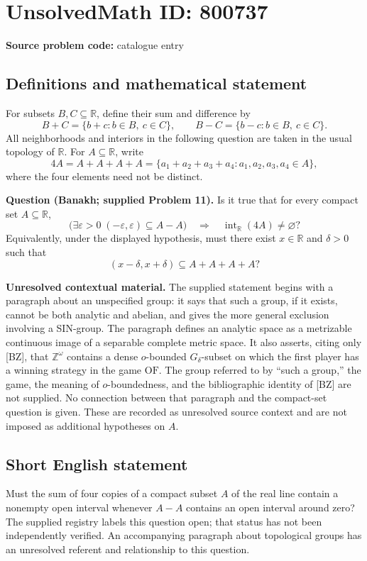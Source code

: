 \documentclass[11pt]{article}
\newcommand{\R}{\mathbb{R}}
\begin{document}
\section*{UnsolvedMath ID: 800737}
\textbf{Source problem code:} catalogue entry
\subsection{Definitions and mathematical statement}
For subsets \(B,C\subseteq\R\), define their sum and difference by
\[
B+C=\{b+c:b\in B,\ c\in C\},\qquad B-C=\{b-c:b\in B,\ c\in C\}.
\]
All neighborhoods and interiors in the following question are taken in the usual topology of \(\R\). For \(A\subseteq\R\), write
\[
4A=A+A+A+A=\{a_1+a_2+a_3+a_4:a_1,a_2,a_3,a_4\in A\},
\]
where the four elements need not be distinct.

\textbf{Question (Banakh; supplied Problem 11).} Is it true that for every compact set \(A\subseteq\R\),
\[
\bigl(\exists\varepsilon>0\;(-\varepsilon,\varepsilon)\subseteq A-A\bigr)
\quad\Longrightarrow\quad
\operatorname{int}_{\R}(4A)\ne\varnothing?
\]
Equivalently, under the displayed hypothesis, must there exist \(x\in\R\) and \(\delta>0\) such that
\[
(x-\delta,x+\delta)\subseteq A+A+A+A?
\]

\textbf{Unresolved contextual material.} The supplied statement begins with a paragraph about an unspecified group: it says that such a group, if it exists, cannot be both analytic and abelian, and gives the more general exclusion involving a SIN-group. The paragraph defines an analytic space as a metrizable continuous image of a separable complete metric space. It also asserts, citing only [BZ], that \(\mathbb{Z}^{\omega}\) contains a dense \(o\)-bounded \(G_\delta\)-subset on which the first player has a winning strategy in the game \(\mathrm{OF}\). The group referred to by ``such a group,'' the game, the meaning of \(o\)-boundedness, and the bibliographic identity of [BZ] are not supplied. No connection between that paragraph and the compact-set question is given. These are recorded as unresolved source context and are not imposed as additional hypotheses on \(A\).
\subsection{Short English statement}
Must the sum of four copies of a compact subset \(A\) of the real line contain a nonempty open interval whenever \(A-A\) contains an open interval around zero? The supplied registry labels this question open; that status has not been independently verified. An accompanying paragraph about topological groups has an unresolved referent and relationship to this question.
\end{document}
